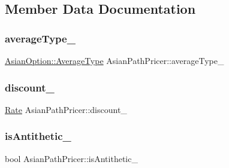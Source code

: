 \subsection{Member Data Documentation}
\hypertarget{class_asian_path_pricer_a28ff57b497033627d84ffa2273b6613e}{}\label{class_asian_path_pricer_a28ff57b497033627d84ffa2273b6613e} 
\subsubsection{\texorpdfstring{average\+Type\+\_\+}{averageType\_}}
{\footnotesize\ttfamily \hyperlink{class_asian_option_add7292791bf85820ff9fdbfd4407f3b9}{Asian\+Option\+::\+Average\+Type} Asian\+Path\+Pricer\+::average\+Type\+\_\+\hspace{0.3cm}{\ttfamily [private]}}

\hypertarget{class_asian_path_pricer_a3b8dfce72f9ec0d56c116b7b27e8504f}{}\label{class_asian_path_pricer_a3b8dfce72f9ec0d56c116b7b27e8504f} 
\subsubsection{\texorpdfstring{discount\+\_\+}{discount\_}}
{\footnotesize\ttfamily \hyperlink{_name_def_8h_a25bee43a162de339c81f3d1caf6b887d}{Rate} Asian\+Path\+Pricer\+::discount\+\_\+\hspace{0.3cm}{\ttfamily [private]}}

\hypertarget{class_asian_path_pricer_ad42c5d8d3b3d1c66d01620491c07bef6}{}\label{class_asian_path_pricer_ad42c5d8d3b3d1c66d01620491c07bef6} 
\subsubsection{\texorpdfstring{is\+Antithetic\+\_\+}{isAntithetic\_}}
{\footnotesize\ttfamily bool Asian\+Path\+Pricer\+::is\+Antithetic\+\_\+\hspace{0.3cm}{\ttfamily [private]}}

\hypertarget{class_asian_path_pricer_acad7de97a262edf4e9f0ebb5f70e81f1}{}\label{class_asian_path_pricer_acad7de97a262edf4e9f0ebb5f70e81f1} 
